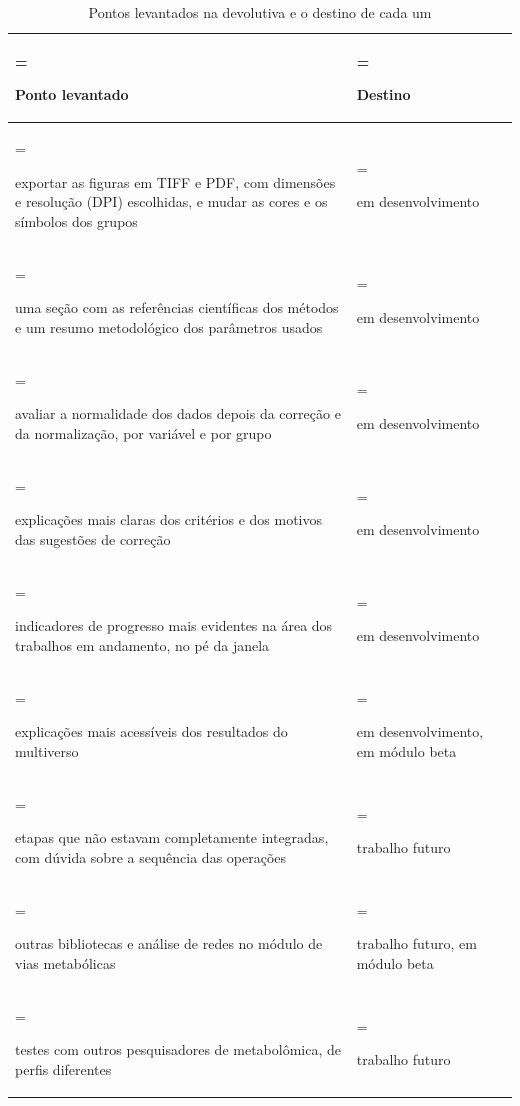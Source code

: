 \begin{table}[htbp]
\centering
\caption{Pontos levantados na devolutiva e o destino de cada um}\label{tab:5-9}
\normalsize
\begin{tabularx}{\linewidth}{|>{\hsize=1.28\hsize\linewidth=\hsize\raggedright\arraybackslash\hspace{0pt}}X|>{\hsize=0.72\hsize\linewidth=\hsize\raggedright\arraybackslash\hspace{0pt}}X|}
\hline
\textbf{Ponto levantado} & \textbf{Destino} \\
\hline
exportar as figuras em TIFF e PDF, com dimensões e resolução (DPI) escolhidas, e mudar as cores e os símbolos dos grupos & em desenvolvimento \\ \hline
uma seção com as referências científicas dos métodos e um resumo metodológico dos parâmetros usados & em desenvolvimento \\ \hline
avaliar a normalidade dos dados depois da correção e da normalização, por variável e por grupo & em desenvolvimento \\ \hline
explicações mais claras dos critérios e dos motivos das sugestões de correção & em desenvolvimento \\ \hline
indicadores de progresso mais evidentes na área dos trabalhos em andamento, no pé da janela & em desenvolvimento \\ \hline
explicações mais acessíveis dos resultados do multiverso & em desenvolvimento, em módulo beta \\ \hline
etapas que não estavam completamente integradas, com dúvida sobre a sequência das operações & trabalho futuro \\ \hline
outras bibliotecas e análise de redes no módulo de vias metabólicas & trabalho futuro, em módulo beta \\ \hline
testes com outros pesquisadores de metabolômica, de perfis diferentes & trabalho futuro \\ \hline
\end{tabularx}
\end{table}


